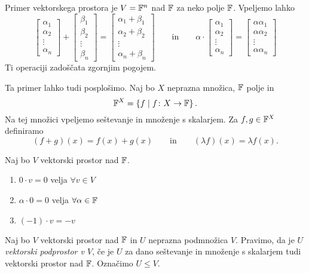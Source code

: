 \documentclass[12pt, a4paper]{article}
\begin{document}
Primer vektorskega prostora je $V=\mathbb{F}^n$ nad $\mathbb{F}$ za neko polje $\mathbb{F}$. Vpeljemo lahko
\[
\begin{bmatrix}
\alpha_1 \\
\alpha_2 \\
\vdots \\
\alpha_n
\end{bmatrix}
+
\begin{bmatrix}
\beta_1 \\
\beta_2 \\
\vdots \\
\beta_n
\end{bmatrix}
=
\begin{bmatrix}
\alpha_1+\beta_1 \\
\alpha_2+\beta_2 \\
\vdots \\
\alpha_n+\beta_n
\end{bmatrix}
\qquad
\text{in}
\qquad
\alpha\cdot
\begin{bmatrix}
\alpha_1 \\
\alpha_2 \\
\vdots \\
\alpha_n
\end{bmatrix}
=
\begin{bmatrix}
\alpha\alpha_1 \\
\alpha\alpha_2 \\
\vdots \\
\alpha\alpha_n
\end{bmatrix}
\]
Ti operaciji zadoščata zgornjim pogojem.

Ta primer lahko tudi posplošimo. Naj bo $X$ neprazna množica, $\mathbb{F}$ polje in
\[
\mathbb{F}^X=\left\{f\mid f\colon X\to\mathbb{F}\right\}.
\]
Na tej množici vpeljemo seštevanje in množenje s skalarjem. Za $f,g\in\mathbb{F}^X$ definiramo
\[
(f+g)(x)=f(x)+g(x)\qquad\text{in}\qquad (\lambda f)(x)=\lambda f(x).
\]

\begin{trditev}
Naj bo $V$ vektorski prostor nad $\mathbb{F}$.

\begin{enumerate}[label=\alph*)]
\item $0\cdot v=0$ velja $\forall v\in V$
\item $\alpha\cdot 0=0$ velja $\forall \alpha\in\mathbb{F}$
\item $(-1)\cdot v=-v$
\end{enumerate}
\end{trditev}

\obvs

\begin{definicija}
Naj bo $V$ vektorski prostor nad $\mathbb{F}$ in $U$ neprazna podmnožica $V$. Pravimo, da je $U$ \emph{vektorski podprostor v $V$}, če je $U$ za dano seštevanje in množenje s skalarjem tudi vektorski prostor nad $\mathbb{F}$. Označimo $U\leq V$.
\end{definicija}
\end{document}
